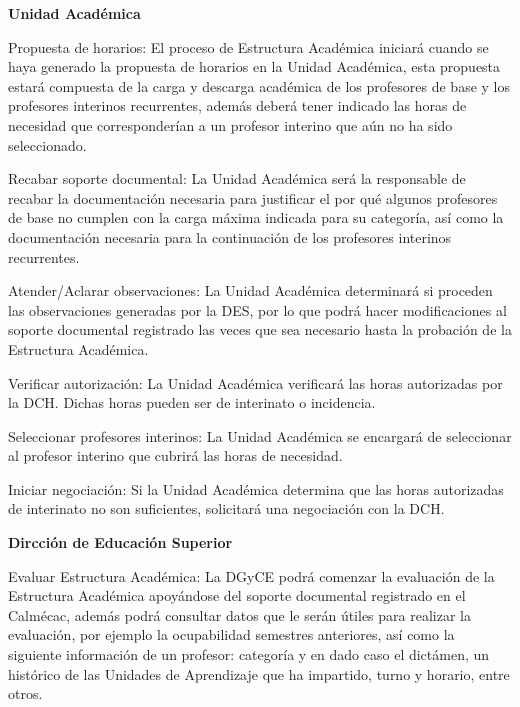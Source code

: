 \begin{PDescripcion}
		\Ppaso \textbf{Unidad Académica}
	\begin{enumerate}
		\Ppaso[\Einicio] Propuesta de horarios: El proceso de Estructura Académica iniciará cuando se haya generado la propuesta de horarios en la Unidad Académica, esta propuesta estará compuesta de la carga y descarga académica de los profesores de base y los profesores interinos recurrentes, además deberá tener indicado las horas de necesidad que corresponderían a un profesor interino que aún no ha sido seleccionado.
		
		\Ppaso[\PSubProceso] Recabar soporte documental: La Unidad Académica será la responsable de recabar la documentación necesaria para justificar el por qué algunos profesores de base no cumplen con la carga máxima indicada para su categoría, así como la documentación necesaria para la continuación de los profesores interinos recurrentes.
		
		\Ppaso[\PSubProceso] Atender/Aclarar observaciones: La Unidad Académica determinará si proceden las observaciones generadas por la DES, por lo que podrá hacer modificaciones al soporte documental registrado las veces que sea necesario hasta la probación de la Estructura Académica.
		
		\Ppaso[\itarea] Verificar autorización: La Unidad Académica verificará las horas autorizadas por la DCH. Dichas horas pueden ser de interinato o incidencia.
		
		\Ppaso[\PSubProceso] Seleccionar profesores interinos: La Unidad Académica se encargará de seleccionar al profesor interino que cubrirá las horas de necesidad.
		
		\Ppaso[\itarea] Iniciar negociación: Si la Unidad Académica determina que las horas autorizadas de interinato no son suficientes, solicitará una negociación con la DCH.
	\end{enumerate}		
	
	\Ppaso \textbf{Dircción de Educación Superior}
	\begin{enumerate}
		\Ppaso[\PSubProceso] Evaluar Estructura Académica: La DGyCE podrá comenzar la evaluación de la Estructura Académica apoyándose del soporte documental registrado en el Calmécac, además podrá consultar datos que le serán útiles para realizar la evaluación, por ejemplo la ocupabilidad semestres anteriores, así como la siguiente información de un profesor: categoría y en dado caso el dictámen, un histórico de las Unidades de Aprendizaje que ha impartido, turno y horario, entre otros.
		

\end{enumerate}
\end{PDescripcion}
